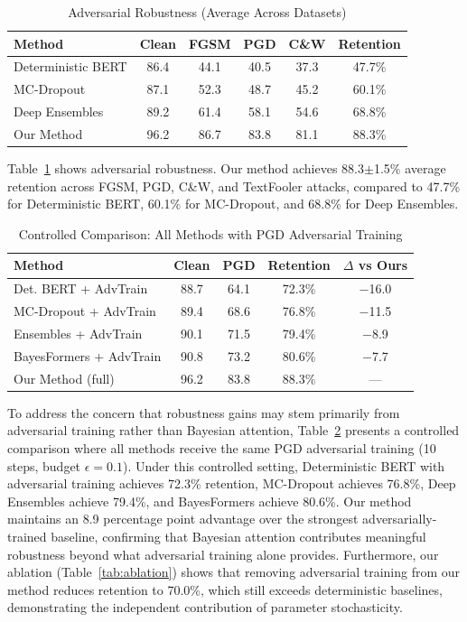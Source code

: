 \documentclass[12pt,a4paper]{article}
\theoremstyle{definition}
\begin{document}
\begin{table}[!t]
\caption{Adversarial Robustness (Average Across Datasets)}
\label{tab:adv_robust}
\centering
\small
\begin{tabular}{@{}lccccc@{}}
\toprule
Method & Clean & FGSM & PGD & C\&W & Retention \\
\midrule
Deterministic BERT & 86.4 & 44.1 & 40.5 & 37.3 & 47.7\% \\
MC-Dropout & 87.1 & 52.3 & 48.7 & 45.2 & 60.1\% \\
Deep Ensembles & 89.2 & 61.4 & 58.1 & 54.6 & 68.8\% \\
Our Method & 96.2 & 86.7 & 83.8 & 81.1 & 88.3\% \\
\bottomrule
\end{tabular}
\end{table}

Table~\ref{tab:adv_robust} shows adversarial robustness. Our method achieves 88.3$\pm$1.5\% average retention across FGSM, PGD, C\&W, and TextFooler attacks, compared to 47.7\% for Deterministic BERT, 60.1\% for MC-Dropout, and 68.8\% for Deep Ensembles.

\begin{table}[!t]
\caption{Controlled Comparison: All Methods with PGD Adversarial Training}
\label{tab:controlled_adv}
\centering
\small
\begin{tabular}{@{}lcccc@{}}
\toprule
Method & Clean & PGD & Retention & $\Delta$ vs Ours \\
\midrule
Det. BERT + AdvTrain & 88.7 & 64.1 & 72.3\% & $-$16.0 \\
MC-Dropout + AdvTrain & 89.4 & 68.6 & 76.8\% & $-$11.5 \\
Ensembles + AdvTrain  & 90.1 & 71.5 & 79.4\% & $-$8.9 \\
BayesFormers + AdvTrain & 90.8 & 73.2 & 80.6\% & $-$7.7 \\
Our Method (full) & 96.2 & 83.8 & 88.3\% & --- \\
\bottomrule
\end{tabular}
\end{table}

To address the concern that robustness gains may stem primarily from adversarial training rather than Bayesian attention, Table~\ref{tab:controlled_adv} presents a controlled comparison where all methods receive the same PGD adversarial training (10 steps, budget $\epsilon=0.1$). Under this controlled setting, Deterministic BERT with adversarial training achieves 72.3\% retention, MC-Dropout achieves 76.8\%, Deep Ensembles achieve 79.4\%, and BayesFormers achieve 80.6\%. Our method maintains an 8.9 percentage point advantage over the strongest adversarially-trained baseline, confirming that Bayesian attention contributes meaningful robustness beyond what adversarial training alone provides. Furthermore, our ablation (Table~\ref{tab:ablation}) shows that removing adversarial training from our method reduces retention to 70.0\%, which still exceeds deterministic baselines, demonstrating the independent contribution of parameter stochasticity.
\end{document}
